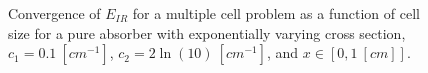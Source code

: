 \begin{figure}[!htp]
\begin{center}
{}
\end{center}
\caption{Convergence of $E_{IR}$ for a multiple cell problem as a function of cell size for a pure absorber with exponentially varying cross section, $c_1 = 0.1~[cm^{-1}]$, $c_2 = 2\ln(10)~[cm^{-1}]$, and $x\in \left[0,1~[cm] \right]$.}
\label{fig:varxs_I_L2}
\end{figure}
%
%
%
